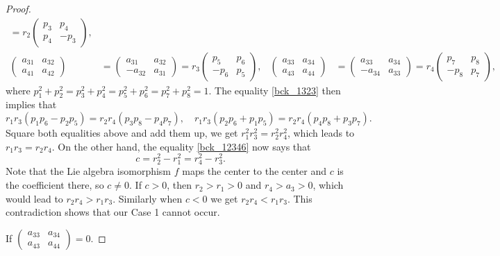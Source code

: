 \documentclass{amsart}
\numberwithin{equation}{section}
\theoremstyle{definition}
\renewcommand{\1}{\mathds{1}}
\renewcommand{\>}{\rightarrow}
\begin{document}
\begin{proof}
\begin{align*}
=r_2 \begin{pmatrix} p_3 & p_4 \\ p_4 & -p_3 \end{pmatrix}, \\
\begin{pmatrix} a_{31} & a_{32} \\ a_{41} & a_{42} \end{pmatrix} &= \begin{pmatrix} a_{31} & a_{32} \\ -a_{32} & a_{31} \end{pmatrix}
=r_3 \begin{pmatrix} p_5 & p_6 \\ -p_6 & p_5 \end{pmatrix}, &
\begin{pmatrix} a_{33} & a_{34} \\ a_{43} & a_{44} \end{pmatrix} &= \begin{pmatrix} a_{33} & a_{34} \\ -a_{34} & a_{33} \end{pmatrix}
=r_4 \begin{pmatrix} p_7 & p_8 \\ -p_8 & p_7 \end{pmatrix},
\end{align*}
where $p_1^2+p_2^2=p_3^2+p_4^2=p_5^2+p_6^2=p_7^2+p_8^2 =1$. The equality \eqref{bck_1323} then implies that
\[r_1 r_3(p_1 p_6 - p_2 p_5)=r_2 r_4(p_3 p_8 - p_4 p_7 ),\quad r_1 r_3(p_2 p_6 + p_1 p_5)=r_2 r_4(p_4 p_8 + p_3 p_7 ). \]
Square both equalities above and add them up,  we get $r^2_1 r^2_3 = r^2_2 r^2_4$,
which leads to $r_1 r_3 = r_2 r_4$. On the other hand, the equality \eqref{bck_12346} now says that
\[ c=r_2^2 -r_1^2 = r_4^2 -r_3^2.\]
Note that the Lie algebra isomorphism $f$ maps the center to the center and $c$ is the coefficient there, so $c\neq 0$. If $c>0$, then $r_2>r_1>0$ and $r_4>a_3>0$, which would lead to $r_2r_4>r_1r_3$. Similarly when $c<0$ we get $r_2r_4<r_1r_3$. This contradiction shows that our Case 1 cannot occur.

\vspace{0.2cm}

 If $\begin{pmatrix}a_{33} & a_{34} \\ a_{43} & a_{44} \end{pmatrix} = 0$.


\end{proof}
\end{document}
